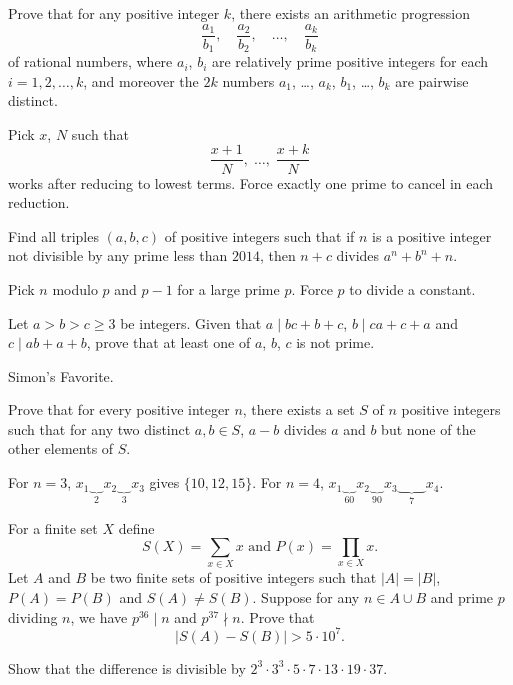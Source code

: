 \documentclass[11pt]{scrartcl}
\begin{document}
\begin{problem}
  [APMO 2009/4] Prove that for any positive integer $k$,
  there exists an arithmetic progression
  \[ \frac{a_1}{b_1}, \quad \frac{a_2}{b_2}, \quad \dots,
    \quad \frac{a_k}{b_k} \]
  of rational numbers, where $a_i$, $b_i$ are relatively prime positive integers for each $i=1,2,\dots,k$,
  and moreover
  the $2k$ numbers $a_1$, \dots, $a_k$, $b_1$, \dots, $b_k$
  are pairwise distinct.
  \begin{hint}
    Pick $x$, $N$ such that
    \[ \frac{x+1}{N}, \; \dots, \;  \frac{x+k}{N} \]
    works after reducing to lowest terms.
    Force exactly one prime to cancel in each reduction.
  \end{hint}
\end{problem}

\begin{problem}
  Find all triples $(a,b,c)$ of positive integers such that if $n$ is a positive integer
  not divisible by any prime less than $2014$, then $n+c$ divides $a^n+b^n+n$.
  \begin{hint}
    Pick $n$ modulo $p$ and $p-1$ for a large prime $p$.
    Force $p$ to divide a constant.
  \end{hint}
\end{problem}

\begin{problem}
  Let $a > b > c \ge 3$ be integers.
  Given that $a \mid bc+b+c$, $b \mid ca+c+a$ and $c \mid ab+a+b$,
  prove that at least one of $a$, $b$, $c$ is not prime.
  \begin{hint}
    Simon's Favorite.
  \end{hint}
\end{problem}

\begin{problem}
  Prove that for every positive integer $n$, there exists a set $S$ of $n$ positive integers
  such that for any two distinct $a,b \in S$, $a-b$ divides $a$ and $b$
  but none of the other elements of $S$.
  \begin{hint}
    For $n=3$, $x_1 \underbrace{\quad}_{2} x_2 \underbrace{\quad}_{3} x_3$ gives $\{10,12,15\}$.
    For $n=4$,
    $x_1 \underbrace{\quad}_{60} x_2 \underbrace{\quad}_{90} x_3 \underbrace{\qquad}_{7} x_4$.
  \end{hint}
\end{problem}

\begin{problem}
  For a finite set $X$ define
  \[ S(X) = \sum_{x \in X} x \text{ and }  P(x) = \prod_{x \in X} x.  \]
  Let $A$ and $B$ be two finite sets of positive integers
  such that $\left\lvert A \right\rvert = \left\lvert B \right\rvert$, $P(A) = P(B)$ and $S(A) \neq S(B)$.
  Suppose for any $n \in A \cup B$ and prime $p$ dividing $n$,
  we have $p^{36} \mid n$ and $p^{37} \nmid n$.
  Prove that \[ \left\lvert S(A) - S(B) \right\rvert > 5 \cdot 10^{7}. \]
  \begin{hint}
    Show that the difference is divisible by
    $2^3 \cdot 3^3 \cdot 5 \cdot 7 \cdot 13 \cdot 19 \cdot 37$.
  \end{hint}
\end{problem}
\end{document}
